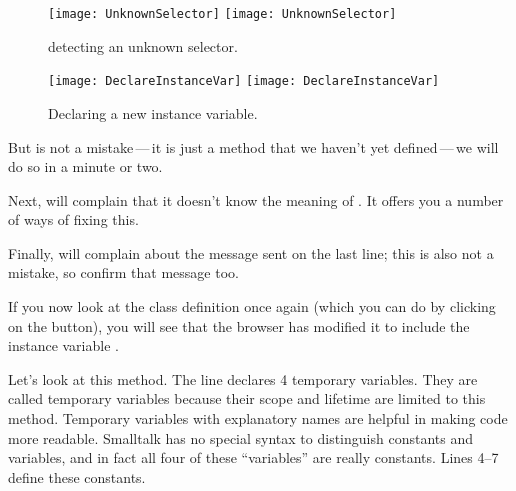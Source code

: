\documentclass[a4paper,10pt,twoside]{book}
\begin{document}
\begin{figure}[htb]
\begin{minipage}{0.48\textwidth}
	\centering
	\ifluluelse
		{\texttt{[image: UnknownSelector]}}
		{\texttt{[image: UnknownSelector]}}
	\caption{\pharo detecting an unknown selector.}
\end{minipage}
\hfill
\begin{minipage}{0.48\textwidth}
	\centering
	\ifluluelse
		{\texttt{[image: DeclareInstanceVar]}}
		{\texttt{[image: DeclareInstanceVar]}}
	\caption{Declaring a new instance variable.}
\end{minipage}
\end{figure}

But  is not a mistake\,---\,it is just a method that we haven't yet defined\,---\,we will do so in a minute or two.


Next, \pharo will complain that it doesn't know the meaning of .  It offers you a number of ways of fixing this.

Finally, \pharo will complain about the message  sent on the last line; this is also not a mistake, so confirm that message too.

If you now look at the class definition once again (which you can do by clicking on the  button), you will see that the browser has modified it to include the instance variable .

Let's look at this  method.
The line   declares 4 temporary variables. They are called temporary variables because their scope and lifetime are limited to this method.  Temporary variables with explanatory names are helpful in making code more readable.  Smalltalk has no special syntax to distinguish constants and variables, and in fact all four of these ``variables'' are really constants. 
Lines 4--7 define these constants.
\end{document}
